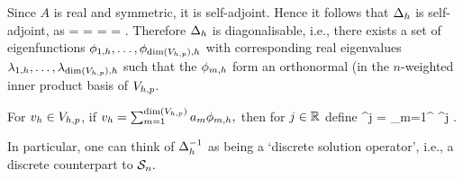 
Since $A$ is real and symmetric, it is self-adjoint. Hence it follows that $\Delta_{h}$ is self-adjoint, as
\beqs
\IPLtDn{\Deltah \wh}{\vh} =  =  = \overline{\IPLtDn{\Deltah \vh}{\wh}} = \IPLtDn{\wh}{\Deltah \vh}.
\eeqs
Therefore $\Delta_{h}$ is diagonalisable, i.e., there exists a set of eigenfunctions $\phioh,\ldots,\phidimVhph$  with corresponding real eigenvalues $\lambdaoh, \ldots, \lambdadimVhph$ such that the $\phi_{m,h}$ form an orthonormal (in the $n$-weighted inner product basis of $V_{h,p}$.

For $v_{h} \in V_{h,p}$, if $\vh = \sum_{m=1}^{\dimVhp} \am \phimh,$ then for $j \in \mathbb R$ define
\beqs
\Deltah^j \vh = \sum_{m=1}^{\dimVhp} \lambdamh^j \am \phimh.
\eeqs

\ede
In particular, one can think of $\Delta_{h}^{-1}$ as being a `discrete solution operator', i.e., a discrete counterpart to $\mathcal S_{n}.$





